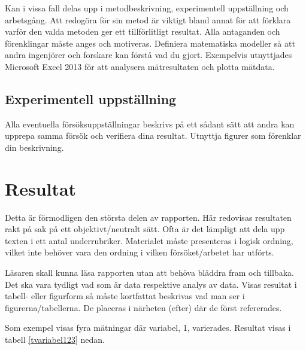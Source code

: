 \documentclass[a4paper]{article}
\begin{document}
Kan i vissa fall delas upp i metodbeskrivning, experimentell uppställning och arbetsgång. Att redogöra för sin metod är viktigt bland annat för att förklara varför den valda metoden ger ett tillförlitligt resultat. Alla antaganden och förenklingar måste anges och motiveras. Definiera matematiska modeller så att andra ingenjörer och forskare kan förstå vad du gjort.
Exempelvis utnyttjades Microsoft Excel 2013 för att analysera mätresultaten och plotta mätdata.


\subsection{Experimentell uppställning}

Alla eventuella försöksuppställningar beskrivs på ett sådant sätt att andra kan upprepa samma försök och verifiera dina resultat. Utnyttja figurer som förenklar din beskrivning.

\section{Resultat}


Detta är förmodligen den största delen av rapporten. Här redovisas resultaten rakt på sak på ett objektivt/neutralt sätt. Ofta är det lämpligt att dela upp texten i ett antal underrubriker. Materialet måste presenteras i logisk ordning, vilket inte behöver vara den ordning i vilken försöket/arbetet har utförts.

Läsaren skall kunna läsa rapporten utan att behöva bläddra fram och tillbaka. Det ska vara tydligt vad som är data respektive analys av data.
Visas resultat i tabell- eller figurform så måste kortfattat beskrivas vad man ser i figurerna/tabellerna. De placeras i närheten (efter) där de först refererades.

Som exempel visas fyra mätningar där variabel, 1, varierades. Resultat visas i tabell \ref{tvariabel123} nedan.

\end{document}
